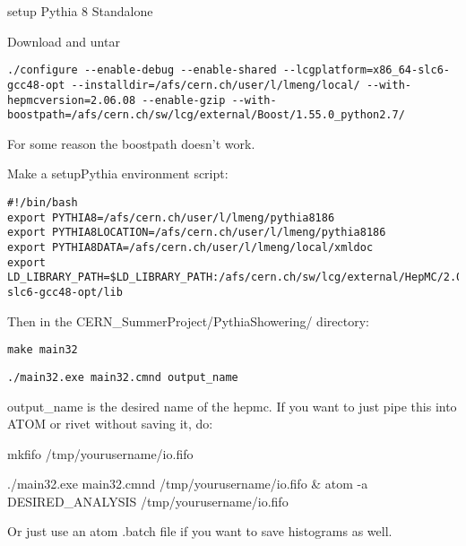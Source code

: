 setup Pythia 8 Standalone

Download and untar 

\lstinline|./configure --enable-debug --enable-shared --lcgplatform=x86_64-slc6-gcc48-opt --installdir=/afs/cern.ch/user/l/lmeng/local/ --with-hepmcversion=2.06.08 --enable-gzip --with-boostpath=/afs/cern.ch/sw/lcg/external/Boost/1.55.0_python2.7/|

For some reason the boostpath doesn't work.

Make a setupPythia environment script:

\begin{lstlisting}
#!/bin/bash
export PYTHIA8=/afs/cern.ch/user/l/lmeng/pythia8186
export PYTHIA8LOCATION=/afs/cern.ch/user/l/lmeng/pythia8186
export PYTHIA8DATA=/afs/cern.ch/user/l/lmeng/local/xmldoc
export LD_LIBRARY_PATH=$LD_LIBRARY_PATH:/afs/cern.ch/sw/lcg/external/HepMC/2.06.08/x86_64-slc6-gcc48-opt/lib

\end{lstlisting}

Then in the CERN_SummerProject/PythiaShowering/ directory:

\lstinline|make main32|

\lstinline|./main32.exe main32.cmnd output_name|

output_name is the desired name of the hepmc. If you want to just pipe this into ATOM or rivet without saving it, do:

mkfifo /tmp/yourusername/io.fifo

./main32.exe main32.cmnd /tmp/yourusername/io.fifo & atom -a DESIRED_ANALYSIS /tmp/yourusername/io.fifo

Or just use an atom .batch file if you want to save histograms as well.